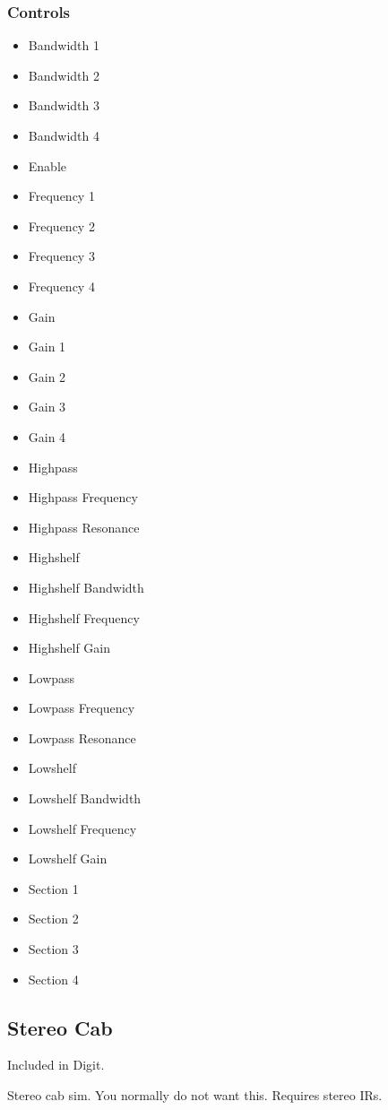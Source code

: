 \subsubsection{Controls}
\begin{itemize}
\item Bandwidth 1
\item Bandwidth 2
\item Bandwidth 3
\item Bandwidth 4
\item Enable
\item Frequency 1
\item Frequency 2
\item Frequency 3
\item Frequency 4
\item Gain
\item Gain 1
\item Gain 2
\item Gain 3
\item Gain 4
\item Highpass
\item Highpass Frequency
\item Highpass Resonance
\item Highshelf
\item Highshelf Bandwidth
\item Highshelf Frequency
\item Highshelf Gain
\item Lowpass
\item Lowpass Frequency
\item Lowpass Resonance
\item Lowshelf
\item Lowshelf Bandwidth
\item Lowshelf Frequency
\item Lowshelf Gain
\item Section 1
\item Section 2
\item Section 3
\item Section 4
\end{itemize}

\subsection{Stereo Cab}

Included in Digit.

Stereo cab sim. You normally do not want this. Requires stereo IRs.



